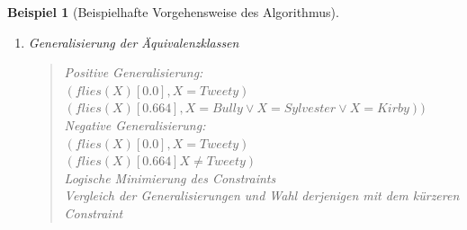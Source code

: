 \documentclass[a4paper, 11pt]{book}
\newtheorem{Bsp}{Beispiel}[section]
\begin{document}
{\begin{Bsp}[Beispielhafte Vorgehensweise des Algorithmus]
\begin{enumerate}
		\begin{quote}
			Klasse 1: $\{(flies(Tweety))[0.0]\}$\\
			Klasse 2: $\{(flies(Bully))[0.664], (flies(Sylvester))[0.664], (flies(Kirby))[0.664]\}$
		\end{quote}
		
		\item Generalisierung der Äquivalenzklassen
		\begin{quote}
			
			
			Positive Generalisierung:\\  
			$ (flies(X)[0.0], X=Tweety) $\\
			$ (flies(X)[0.664], X=Bully \lor  X=Sylvester \lor X=Kirby)) $\\
			Negative Generalisierung:\\  
			$ (flies(X)[0.0], X=Tweety) $\\
			$ (flies(X)[0.664] X \neq Tweety) $\\
			Logische Minimierung des Constraints\\
			Vergleich der Generalisierungen und Wahl derjenigen mit dem kürzeren Constraint\\
		\end{quote}
	\end{enumerate}
	
\end{Bsp}

}
\end{document}
